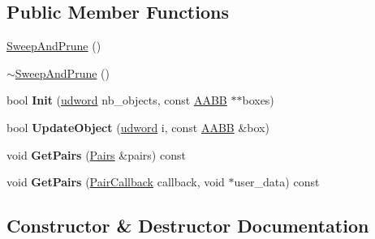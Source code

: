 \subsection*{Public Member Functions}
\begin{DoxyCompactItemize}
\item 
\hyperlink{classOpcode_1_1SweepAndPrune_a4c7f996dd7672c1566a0b3696677cb71}{Sweep\+And\+Prune} ()
\item 
\hyperlink{classOpcode_1_1SweepAndPrune_acf571407e5f02c89e80d0ad87f71734a}{$\sim$\+Sweep\+And\+Prune} ()
\item 
bool {\bfseries Init} (\hyperlink{IceTypes_8h_a44c6f1920ba5551225fb534f9d1a1733}{udword} nb\+\_\+objects, const \hyperlink{classOpcode_1_1AABB}{A\+A\+BB} $\ast$$\ast$boxes)\hypertarget{classOpcode_1_1SweepAndPrune_a4c144d73e7b6831358d5fa3ccf88b389}{}\label{classOpcode_1_1SweepAndPrune_a4c144d73e7b6831358d5fa3ccf88b389}

\item 
bool {\bfseries Update\+Object} (\hyperlink{IceTypes_8h_a44c6f1920ba5551225fb534f9d1a1733}{udword} i, const \hyperlink{classOpcode_1_1AABB}{A\+A\+BB} \&box)\hypertarget{classOpcode_1_1SweepAndPrune_a75e57fa924b1173bc4f88b372ab1d649}{}\label{classOpcode_1_1SweepAndPrune_a75e57fa924b1173bc4f88b372ab1d649}

\item 
void {\bfseries Get\+Pairs} (\hyperlink{classPairs}{Pairs} \&pairs) const \hypertarget{classOpcode_1_1SweepAndPrune_a9cea180729e3e965ecbc68c086b079ec}{}\label{classOpcode_1_1SweepAndPrune_a9cea180729e3e965ecbc68c086b079ec}

\item 
void {\bfseries Get\+Pairs} (\hyperlink{OPC__SweepAndPrune_8h_a4609c7fbc34f117277b8b563bfb2d582}{Pair\+Callback} callback, void $\ast$user\+\_\+data) const \hypertarget{classOpcode_1_1SweepAndPrune_aaa7080ff61fda85e71ba79f28cbc831d}{}\label{classOpcode_1_1SweepAndPrune_aaa7080ff61fda85e71ba79f28cbc831d}

\end{DoxyCompactItemize}


\subsection{Constructor \& Destructor Documentation}
